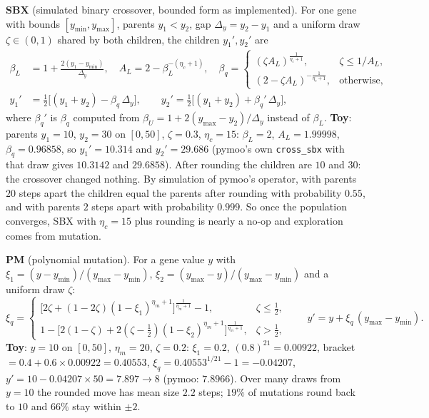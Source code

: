 \documentclass[11pt,a4paper]{article}
\newcommand{\code}[1]{\texttt{\nolinkurl{#1}}}
\begin{document}
\textbf{SBX} (simulated binary crossover, bounded form as implemented). For one gene with bounds $[y_{\min},y_{\max}]$, parents $y_1<y_2$,
gap $\Delta_y=y_2-y_1$ and a uniform draw $\zeta\in(0,1)$ shared by both children, the children $y_1',y_2'$ are
\begin{equation}
\begin{aligned}
\beta_L&=1+\tfrac{2(y_1-y_{\min})}{\Delta_y},\quad A_L=2-\beta_L^{-(\eta_c+1)},\quad
\beta_q=\begin{cases}(\zeta A_L)^{\frac1{\eta_c+1}}, & \zeta\le 1/A_L,\\[2pt] (2-\zeta A_L)^{-\frac1{\eta_c+1}}, & \text{otherwise},\end{cases}\\
y_1'&=\tfrac12\big[(y_1+y_2)-\beta_q\,\Delta_y\big],\qquad
y_2'=\tfrac12\big[(y_1+y_2)+\beta_q'\,\Delta_y\big],
\end{aligned}
\label{eq:sbx}
\end{equation}
where $\beta_q'$ is $\beta_q$ computed from $\beta_U=1+2(y_{\max}-y_2)/\Delta_y$ instead of $\beta_L$.
\textbf{Toy}: parents $y_1=10$, $y_2=30$ on $[0,50]$, $\zeta=0.3$, $\eta_c=15$: $\beta_L=2$, $A_L=1.99998$, $\beta_q=0.96858$, so $y_1'=10.314$ and
$y_2'=29.686$ (pymoo's own \code{cross_sbx} with that draw gives $10.3142$ and $29.6858$). After rounding the children are $10$ and $30$: the crossover
changed nothing. By simulation of pymoo's operator, with parents $20$ steps apart the children equal the parents after rounding with probability
$0.55$, and with parents $2$ steps apart with probability $0.999$. So once the population converges, SBX with $\eta_c=15$ plus rounding is nearly a no-op
and exploration comes from mutation.

\textbf{PM} (polynomial mutation). For a gene value $y$ with $\xi_1=(y-y_{\min})/(y_{\max}-y_{\min})$, $\xi_2=(y_{\max}-y)/(y_{\max}-y_{\min})$ and a uniform draw $\zeta$:
\begin{equation}
\xi_q=\begin{cases}\big[2\zeta+(1-2\zeta)(1-\xi_1)^{\eta_m+1}\big]^{\frac1{\eta_m+1}}-1, & \zeta\le\tfrac12,\\[3pt]
1-\big[2(1-\zeta)+2(\zeta-\tfrac12)(1-\xi_2)^{\eta_m+1}\big]^{\frac1{\eta_m+1}}, & \zeta>\tfrac12,\end{cases}
\qquad y'=y+\xi_q\,(y_{\max}-y_{\min}).
\label{eq:pm}
\end{equation}
\textbf{Toy}: $y=10$ on $[0,50]$, $\eta_m=20$, $\zeta=0.2$: $\xi_1=0.2$, $(0.8)^{21}=0.00922$, bracket $=0.4+0.6\times0.00922=0.40553$,
$\xi_q=0.40553^{1/21}-1=-0.04207$, $y'=10-0.04207\times50=7.897\to8$ (pymoo: $7.8966$). Over many draws from $y=10$ the rounded move has mean size
$2.2$ steps; $19\%$ of mutations round back to $10$ and $66\%$ stay within $\pm2$.
\end{document}
